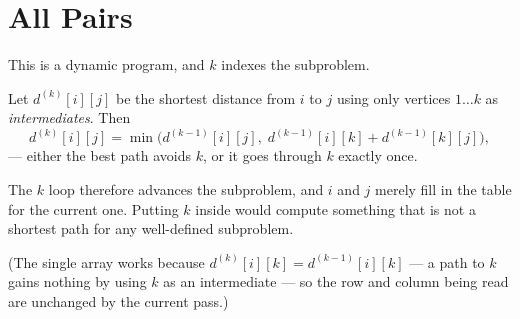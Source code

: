 \section{All Pairs}


\begin{conceptbox}
This is a dynamic program, and $k$ indexes the subproblem.

\smallskip
Let $d^{(k)}[i][j]$ be the shortest distance from $i$ to $j$ using only
vertices $1 \ldots k$ as \emph{intermediates}. Then
\[ d^{(k)}[i][j] = \min\bigl(d^{(k-1)}[i][j],\;
   d^{(k-1)}[i][k] + d^{(k-1)}[k][j]\bigr), \]
--- either the best path avoids $k$, or it goes through $k$ exactly once.

\smallskip
The $k$ loop therefore advances the subproblem, and $i$ and $j$ merely fill in
the table for the current one. Putting $k$ inside would compute something that
is not a shortest path for any well-defined subproblem.

\smallskip
(The single array works because $d^{(k)}[i][k] = d^{(k-1)}[i][k]$ --- a path to
$k$ gains nothing by using $k$ as an intermediate --- so the row and column
being read are unchanged by the current pass.)
\end{conceptbox}

